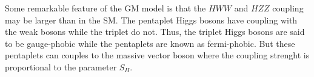 Some remarkable feature of the GM model is that the $HWW$ and $HZZ$ coupling may be larger than in the SM. 
The pentaplet Higgs bosons have coupling with the weak bosons while the triplet do not. Thus, the triplet Higgs bosons are said to be gauge-phobic while the pentaplets are known as fermi-phobic.
But these pentaplets can couples to the massive vector boson where the coupling strenght is proportional to the parameter $S_H$.











